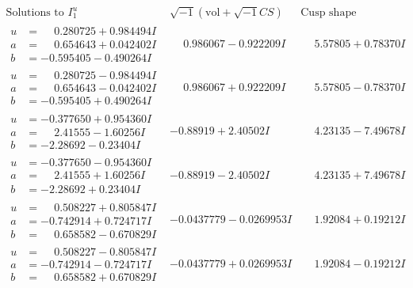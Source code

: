 \documentclass[1p]{elsarticle_modified}
\theoremstyle{definition}
\newcommand{\I}{\sqrt{-1}}
\begin{document}
$$\begin{array}{c|c|c}  
\text{Solutions to }I^u_{1}& \I (\text{vol} + \sqrt{-1}CS) & \text{Cusp shape}\\
 \hline 
\begin{aligned}
u &= \phantom{-}0.280725 + 0.984494 I \\
a &= \phantom{-}0.654643 + 0.042402 I \\
b &= -0.595405 - 0.490264 I\end{aligned}
 & \phantom{-}0.986067 - 0.922209 I & \phantom{-}5.57805 + 0.78370 I \\ \hline\begin{aligned}
u &= \phantom{-}0.280725 - 0.984494 I \\
a &= \phantom{-}0.654643 - 0.042402 I \\
b &= -0.595405 + 0.490264 I\end{aligned}
 & \phantom{-}0.986067 + 0.922209 I & \phantom{-}5.57805 - 0.78370 I \\ \hline\begin{aligned}
u &= -0.377650 + 0.954360 I \\
a &= \phantom{-}2.41555 - 1.60256 I \\
b &= -2.28692 - 0.23404 I\end{aligned}
 & -0.88919 + 2.40502 I & \phantom{-}4.23135 - 7.49678 I \\ \hline\begin{aligned}
u &= -0.377650 - 0.954360 I \\
a &= \phantom{-}2.41555 + 1.60256 I \\
b &= -2.28692 + 0.23404 I\end{aligned}
 & -0.88919 - 2.40502 I & \phantom{-}4.23135 + 7.49678 I \\ \hline\begin{aligned}
u &= \phantom{-}0.508227 + 0.805847 I \\
a &= -0.742914 + 0.724717 I \\
b &= \phantom{-}0.658582 - 0.670829 I\end{aligned}
 & -0.0437779 - 0.0269953 I & \phantom{-}1.92084 + 0.19212 I \\ \hline\begin{aligned}
u &= \phantom{-}0.508227 - 0.805847 I \\
a &= -0.742914 - 0.724717 I \\
b &= \phantom{-}0.658582 + 0.670829 I\end{aligned}
 & -0.0437779 + 0.0269953 I & \phantom{-}1.92084 - 0.19212 I \\ \hline\begin{aligned}

\end{aligned}
\end{array}$$
\end{document}
